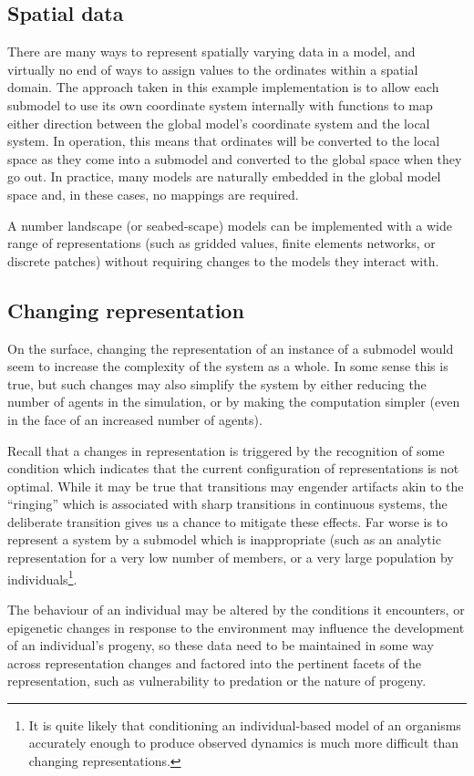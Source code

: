\subsection{Spatial data}
There are many ways to represent spatially varying data in a model,
and virtually no end of ways to assign values to the ordinates within
a spatial domain. The approach taken in this example implementation is to allow
each submodel to use its own coordinate system internally with
functions to map either direction between the global model's
coordinate system and the local system.  In operation, this means that
ordinates will be converted to the local space as they come into a
submodel and converted to the global space when they go out. In
practice, many models are naturally embedded in the global model
space and, in these cases, no mappings are required.

A number landscape (or seabed-scape) models can be implemented 
with a wide range of representations (such as gridded values, finite
elements networks, or discrete patches) without requiring changes to
the models they interact with.

\subsection{Changing representation}
On the surface, changing the representation of an instance of a
submodel would seem to increase the complexity of the system as a
whole.  In some sense this is true, but such changes may also simplify
the system by either reducing the number of agents in the
simulation, or by making the computation simpler (even in the face of
an increased number of agents).

Recall that a changes in representation is triggered by the recognition
of some condition which indicates that the current configuration of
representations is not optimal. While it may be true that transitions
may engender artifacts akin to the ``ringing'' which is associated
with sharp transitions in continuous systems, the deliberate
transition gives us a chance to mitigate these effects.  Far worse is
to represent a system by a submodel which is inappropriate (such as
an analytic representation for a very low number of members, or a very
large population by individuals\footnote{It is quite likely that
conditioning an individual-based model of an organisms accurately
enough to produce observed dynamics is much more difficult than
changing representations.}.

The behaviour of an individual may be altered by the
conditions it encounters, or epigenetic changes in response to the
environment may influence the development of an individual's progeny,
so these data need to be maintained in some way across representation
changes and factored into the pertinent facets of the representation,
such as vulnerability to predation or the nature of progeny.

